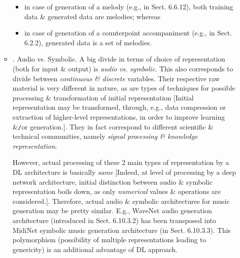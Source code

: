\documentclass{article}
\begin{document}
\begin{itemize}
\begin{itemize}
		\begin{itemize}
			\item in case of generation of a melody (e.g., in Sect. 6.6.12), both training data \& generated data are melodies; whereas
			\item in case of generation of a counterpoint accompaniment (e.g., in Sect. 6.2.2), generated data is a set of melodies.
		\end{itemize}
		\item {. Audio vs. Symbolic.} A big divide in terms of choice of representation (both for input \& output) is {\it audio vs. symbolic}. This also corresponds to divide between {\it continuous \& discrete} variables. Their respective raw material is very different in nature, as are types of techniques for possible processing \& transformation of initial representation [Initial representation may be transformed, through, e.g., data compression or extraction of higher-level representations, in order to improve learning \&{\tt/}or generation.]. They in fact correspond to different scientific \& technical communities, namely {\it signal processing \& knowledge representation}.

		However, actual processing of these 2 main types of representation by a DL architecture is basically {\it same} [Indeed, at level of processing by a deep network architecture, initial distinction between audio \& symbolic representation boils down, as only {\it numerical} values \& operations are considered.]. Therefore, actual audio \& symbolic architectures for music generation may be pretty similar. E.g., WaveNet audio generation architecture (introduced in Sect. 6.10.3.2) has been transposed into MidiNet symbolic music generation architecture (in Sect. 6.10.3.3). This polymorphism (possibility of multiple representations leading to genericity) is an additional advantage of DL approach.


\end{itemize}
\end{itemize}
\end{document}
